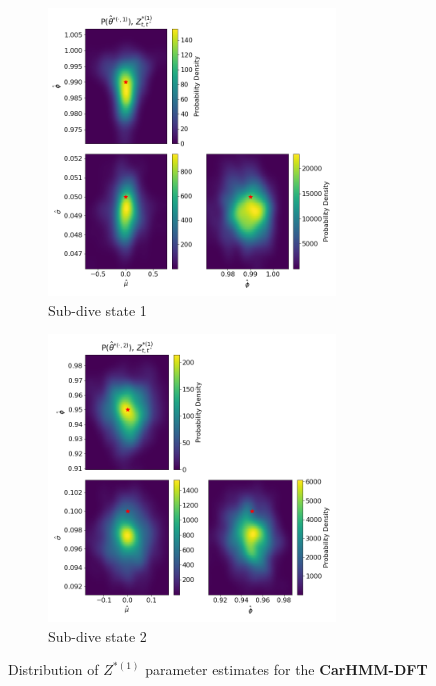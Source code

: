 \documentclass[12pt]{TD-CJS}
\begin{document}
\begin{figure}[ht]
	\centering
	\begin{subfigure}[t]{\textwidth}
        \centering
        \includegraphics[height=3in]{../Plots/hmm_FV_MLE_density_A_0_0.png}
        \caption{Sub-dive state 1}
    \end{subfigure}
    \newline
    \begin{subfigure}[t]{\textwidth}
        \centering
        \includegraphics[height=3in]{../Plots/hmm_FV_MLE_density_A_0_1.png}
        \caption{Sub-dive state 2}
    \end{subfigure}
    \caption{Distribution of $Z^{*(1)}$ parameter estimates for the \textbf{CarHMM-DFT}}
\end{figure}
\end{document}
